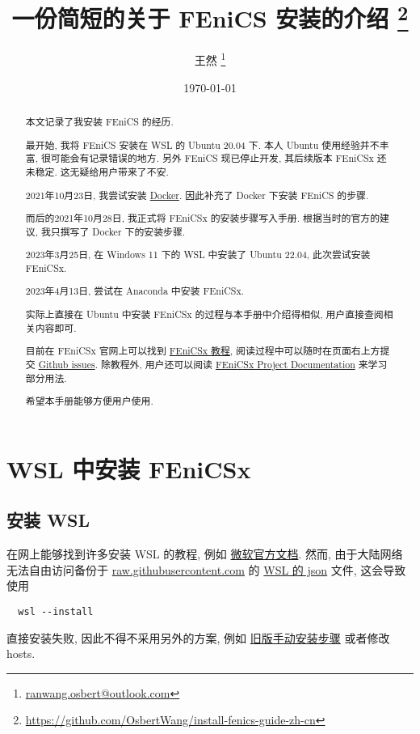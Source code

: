 \documentclass[fontset=founder]{ctexrep}
\title{\bfseries 一份简短的关于 FEniCS 安装的介绍%
  \thanks{\url{https://github.com/OsbertWang/install-fenics-guide-zh-cn}}%
}
\author{王然%
  \thanks{\href{mailto:ranwang.osbert@outlook.com}%
    {\ttfamily ranwang.osbert@outlook.com}}%
}
\date{\today}
\begin{document}
  
\maketitle

\begin{abstract}
  
  本文记录了我安装 FEniCS 的经历.
  
  最开始,
  我将 FEniCS 安装在 WSL 的 Ubuntu 20.04 下.
  本人 Ubuntu 使用经验并不丰富,
  很可能会有记录错误的地方.
  另外 FEniCS 现已停止开发,
  其后续版本 FEniCSx 还未稳定.
  这无疑给用户带来了不安.
  
  2021年10月23日,
  我尝试安装 \href{https://www.docker.com/get-started}{Docker}.
  因此补充了 Docker 下安装 FEniCS 的步骤.
  
  而后的2021年10月28日,
  我正式将 FEniCSx 的安装步骤写入手册.
  根据当时的官方的建议,
  我只撰写了 Docker 下的安装步骤.

  2023年3月25日,
  在 Windows 11 下的 WSL 中安装了 Ubuntu 22.04,
  此次尝试安装 FEniCSx.

  2023年4月13日,
  尝试在 Anaconda 中安装 FEniCSx.
  
  实际上直接在 Ubuntu 中安装 FEniCSx 的过程与本手册中介绍得相似,
  用户直接查阅相关内容即可.

  目前在 FEniCSx 官网上可以找到
  \href{https://jsdokken.com/dolfinx-tutorial/}{FEniCSx 教程},
  阅读过程中可以随时在页面右上方提交 \href{https://github.com/jorgensd/ dolfinx-tutorial/issues/new?title=Issue%20on%20page%20%2Findex.html& body=Your%20issue%20content%20here.}{Github issues}.
  除教程外,
  用户还可以阅读
  \href{https://docs.fenicsproject.org/}{FEniCSx Project Documentation}
  来学习部分用法.

  希望本手册能够方便用户使用.
\end{abstract}

\tableofcontents

\chapter{WSL 中安装 FEniCSx}

\section{安装 WSL}\label{sec:wsl.install}

在网上能够找到许多安装 WSL 的教程,
例如%
\href{https://learn.microsoft.com/zh-cn/windows/wsl/install}{微软官方文档}.
然而,
由于大陆网络无法自由访问备份于 \url{raw.githubusercontent.com} 的
\href{https://raw.githubusercontent.com/microsoft/WSL/master/distributions/DistributionInfo.json}{WSL 的 json} 文件,
这会导致使用
\begin{lstlisting}
  wsl --install
\end{lstlisting}
直接安装失败,
因此不得不采用另外的方案,
例如%
\href{https://learn.microsoft.com/zh-cn/windows/wsl/install-manual}{旧版手动安装步骤}%
或者修改 hosts.
\end{document}
